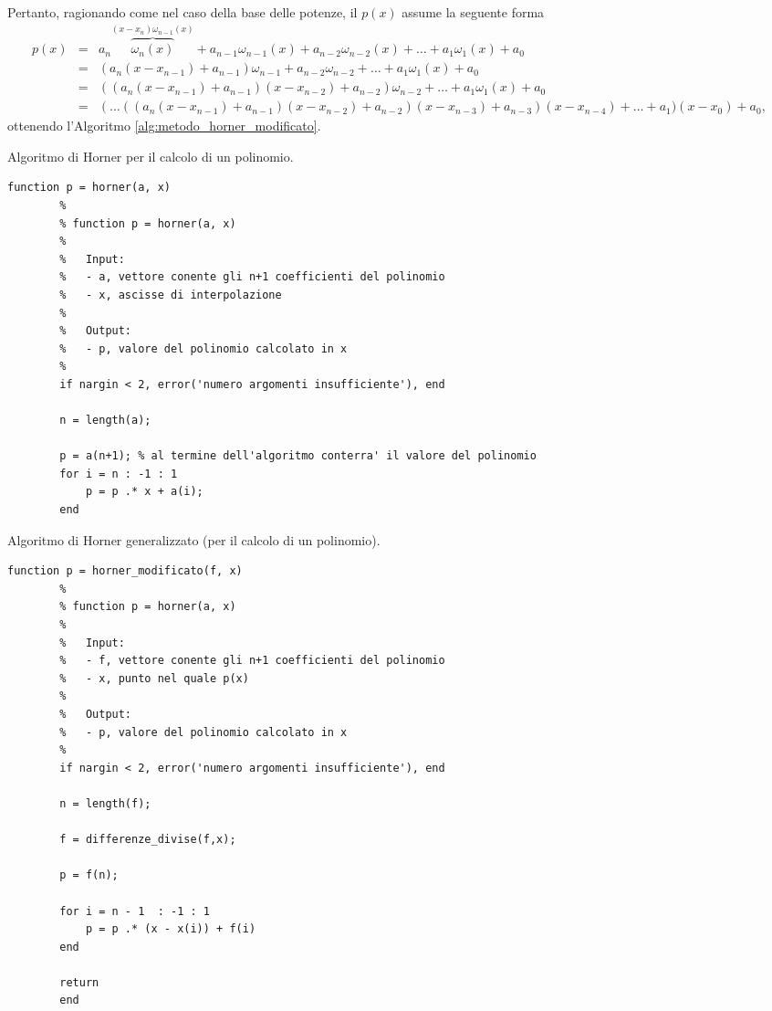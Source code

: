 
\noindent Pertanto, ragionando come nel caso della base delle potenze, il $p(x)$ assume la seguente forma
\begin{equation*}
	\begin{matrix}
		p(x) &=& a_n \overbrace{\omega_{n}(x)}^{(x-x_n)\omega_{n-1}(x)} + a_{n-1} \omega_{n-1}(x) + a_{n-2} \omega_{n-2}(x) + \hdots + a_1 \omega_1(x) + a_0\\
		&=& (a_n (x-x_{n-1}) + a_{n-1}) \omega_{n-1} + a_{n-2} \omega_{n-2} + \hdots + a_1 \omega_1(x) + a_0\\
		&=& ((a_n (x - x_{n-1}) + a_{n-1})(x-x_{n-2}) + a_{n-2})\omega_{n-2} + \hdots + a_1 \omega_1(x) + a_0\\
		&=& (\hdots ((a_n (x-x_{n-1}) + a_{n-1})(x - x_{n-2}) + a_{n-2})(x-x_{n-3}) + a_{n-3})(x-x_{n-4}) + \hdots + a_1 ) (x-x_0) + a_0,
	\end{matrix}
\end{equation*}
ottenendo l'Algoritmo \ref{alg:metodo_horner_modificato}.

\begin{algorithm}
\caption{Algoritmo di Horner per il calcolo di un polinomio.}\label{alg:metodo_horner}
    \begin{lstlisting}[style=Matlab-editor]
    	function p = horner(a, x)
    	%
    	% function p = horner(a, x)
    	%
    	%	Input: 
    	%	- a, vettore conente gli n+1 coefficienti del polinomio
    	%	- x, ascisse di interpolazione
    	%
    	%	Output:
    	%	- p, valore del polinomio calcolato in x
    	%
    	if nargin < 2, error('numero argomenti insufficiente'), end 
    	
    	n = length(a);
    	
        p = a(n+1); % al termine dell'algoritmo conterra' il valore del polinomio
        for i = n : -1 : 1
            p = p .* x + a(i);
        end
    \end{lstlisting}
\end{algorithm}

\begin{algorithm}
\caption{Algoritmo di Horner generalizzato (per il calcolo di un polinomio).}\label{alg:metodo_horner_modificato}
    \begin{lstlisting}[style=Matlab-editor]
    	function p = horner_modificato(f, x)
    	% 
    	% function p = horner(a, x)
    	%
    	%	Input: 
    	%	- f, vettore conente gli n+1 coefficienti del polinomio
    	%	- x, punto nel quale p(x)
    	%
    	%	Output:
    	%	- p, valore del polinomio calcolato in x
    	%
    	if nargin < 2, error('numero argomenti insufficiente'), end 
    	
    	n = length(f);
    	
    	f = differenze_divise(f,x);
    	
        p = f(n);
        
        for i = n - 1  : -1 : 1
            p = p .* (x - x(i)) + f(i)
        end
        
        return
        end
    \end{lstlisting}
\end{algorithm}

